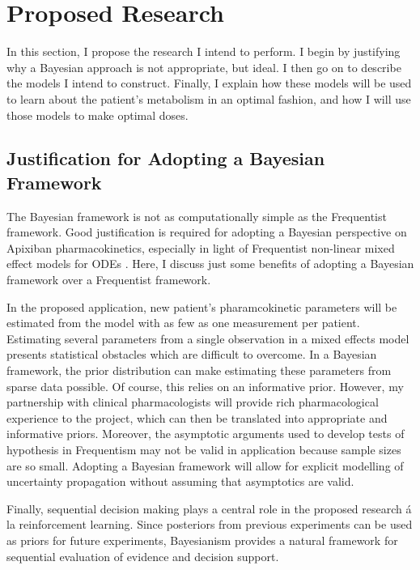 \section{Proposed Research}

In this section, I propose the research I intend to perform. I begin by justifying why a Bayesian approach is not appropriate, but ideal.  I then go on to describe the models I intend to construct.  Finally, I explain how these models will be used to learn about the patient's metabolism in an optimal fashion, and how I will use those models to make optimal doses.

\subsection{Justification for Adopting a Bayesian Framework}

The Bayesian framework is not as computationally simple as the Frequentist framework.  Good justification is required for adopting a Bayesian perspective on Apixiban pharmacokinetics, especially in light of Frequentist non-linear mixed effect models for ODEs \cite{tornoe2004non}.  Here, I discuss just some benefits of adopting a Bayesian framework over a Frequentist framework.

In the proposed application, new patient's pharamcokinetic parameters will be estimated from the model with as few as one measurement per patient.  Estimating several parameters from a single observation in a mixed effects model presents statistical obstacles which are difficult to overcome.  In a Bayesian framework, the prior distribution can make estimating these parameters from sparse data possible.  Of course, this relies on an informative prior.  However, my partnership with clinical pharmacologists will provide rich pharmacological experience to the project, which can then be translated into appropriate and informative priors.  Moreover, the asymptotic arguments used to develop tests of hypothesis in Frequentism may not be valid in application because sample sizes are so small.  Adopting a Bayesian framework will allow for explicit modelling of uncertainty propagation without assuming that asymptotics are valid.

Finally, sequential decision making plays a central role in the proposed research \'{a} la reinforcement learning.  Since posteriors from previous experiments can be used as priors for future experiments, Bayesianism provides a natural framework for sequential evaluation of evidence and decision support.


